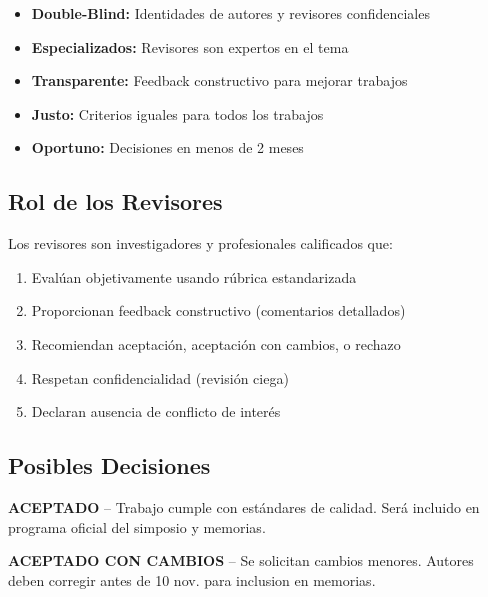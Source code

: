 \documentclass[12pt,a4paper]{article}
\begin{document}
\begin{itemize}[label={\textcolor{verdemid}{\checkmark}}]
  \item \textbf{Double-Blind:} Identidades de autores y revisores confidenciales
  \item \textbf{Especializados:} Revisores son expertos en el tema
  \item \textbf{Transparente:} Feedback constructivo para mejorar trabajos
  \item \textbf{Justo:} Criterios iguales para todos los trabajos
  \item \textbf{Oportuno:} Decisiones en menos de 2 meses
\end{itemize}

\subsection{Rol de los Revisores}

Los revisores son investigadores y profesionales calificados que:

\begin{enumerate}
  \item Evalúan objetivamente usando rúbrica estandarizada
  \item Proporcionan feedback constructivo (comentarios detallados)
  \item Recomiendan aceptación, aceptación con cambios, o rechazo
  \item Respetan confidencialidad (revisión ciega)
  \item Declaran ausencia de conflicto de interés
\end{enumerate}

\subsection{Posibles Decisiones}

\begin{tcolorbox}[enhanced, colback=green!10, colframe=verde, boxrule=1pt, left=10pt, right=10pt, top=8pt, bottom=8pt]
\textbf{ACEPTADO} -- Trabajo cumple con estándares de calidad. Será incluido en programa oficial del simposio y memorias.
\end{tcolorbox}

\begin{tcolorbox}[enhanced, colback=yellow!15, colframe=dorado, boxrule=1pt, left=10pt, right=10pt, top=8pt, bottom=8pt]
\textbf{ACEPTADO CON CAMBIOS} -- Se solicitan cambios menores. Autores deben corregir antes de 10 nov. para inclusion en memorias.
\end{tcolorbox}
\end{document}
